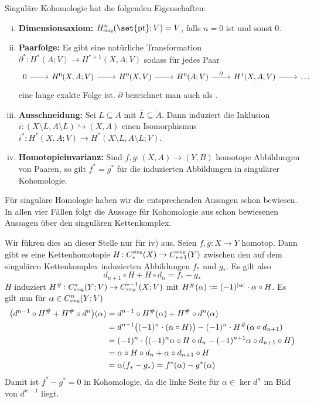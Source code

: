 \begin{satz}[{name=[Eigenschaften singulärer Kohomologie]}]
	Singuläre Kohomologie hat die folgenden Eigenschaften:
	\begin{enumerate}[i),itemsep=1.5pt]
		\item \textbf{Dimensionsaxiom:} $H^n_\sing(\set{\pt};V) = V$, falls $n=0$ ist und sonst $0$. 
		\item \textbf{Paarfolge:} Es gibt eine natürliche Transformation $\partial^*\colon H^*(A;V) \to H^{*+1}(X,A;V)$ sodass für jedes Paar 
		\[
			\begin{tikzcd}
				0 \rar & H^0(X,A;V) \rar & H^0(X,V) \rar & H^0(A;V) \rar["\partial"] & H^1(X,A;V) \rar & \ldots 
			\end{tikzcd}
		\]
		eine lange exakte Folge ist. $\partial$ bezeichnet man auch als .
		\item \textbf{Ausschneidung:} Sei $L \subseteq A$ mit $\overline{L} \subseteq \mathring{A}$. Dann induziert die Inklusion 
		$i \colon (X \setminus L, A \setminus L) \hookrightarrow (X,A)$ einen Isomorphismus $i^* \colon H^*(X,A;V) \to H^*(X \setminus L, A \setminus L;V)$.
		\item \textbf{Homotopieinvarianz:} Sind $f,g \colon (X,A) \to (Y,B)$ homotope Abbildungen von Paaren, so gilt $f^* = g^*$ für die induzierten Abbildungen in singulärer 
		Kohomologie.
	\end{enumerate}
\end{satz}
\begin{beweis}
	Für singuläre Homologie haben wir die entsprechenden Aussagen schon bewiesen. In allen vier Fällen folgt die Aussage für Kohomologie aus schon bewiesenen Aussagen über 
	den singulären Kettenkomplex.
	
	Wir führen dies an dieser Stelle nur für iv) aus. Seien $f, g \colon X \to Y$ homotop. Dann gibt es eine Kettenhomotopie $H \colon C^\sing_*(X) \to C^\sing_{*+1}(Y)$ zwischen den 
	auf dem singulären Kettenkomplex induzierten Abbildungen $f_*$ und $g_*$. Es gilt also
	\[
		d_{n+1} \circ H + H \circ d_n = f_* - g_*
	\]
	$H$ induziert $H^\# \colon C^*_\sing(Y;V) \to C_\sing^{*-1}(X;V)$ mit $H^\#(\alpha) := (-1)^{\lvert\alpha\rvert} \cdot \alpha \circ H$. Es gilt nun für $\alpha \in C_\sing^n(Y;V)$
	\begin{align}
		\enbrace*{d^{n-1} \circ H^\# + H^\# \circ d^n}(\alpha) &= d^{n-1} \circ H^\#(\alpha) + H^\# \circ d^n (\alpha)\\
		&= d^{n-1} \enbrace[\big]{(-1)^n \cdot (\alpha \circ H)} - (-1)^n \cdot H^\# \enbrace*{\alpha \circ d_{n+1}} \\
		&= (-1)^n \cdot \enbrace*{(-1)^{n} \alpha \circ H  \circ d_n - (-1)^{n+1} \alpha \circ d_{n+1} \circ H} \\
		&= \alpha \circ H \circ d_n + \alpha \circ d_{n+1} \circ H \\
		&= \alpha \enbrace*{f_* - g_*} = f^*(\alpha) - g^*(\alpha) 
	\end{align}
	Damit ist $f^* - g^* =0$ in Kohomologie, da die linke Seite für $\alpha \in \ker d^n$ im Bild von $d^{n-1}$ liegt. 
\end{beweis}

